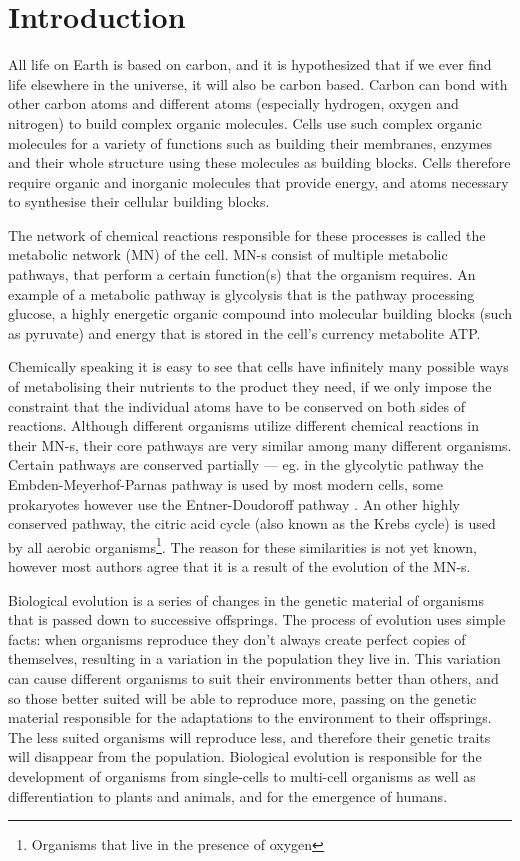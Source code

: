\documentclass[a4paper,12pt]{article}
\begin{document}
	\newpage
	\section{Introduction}

	All life on Earth is based on carbon, and it is hypothesized that if we ever find life elsewhere in the universe, it will also be carbon based. %
	Carbon can bond with other carbon atoms and different atoms (especially hydrogen, oxygen and nitrogen) to build complex organic molecules. Cells use such complex organic molecules for a variety of functions such as building their membranes, enzymes and their whole structure using these molecules as building blocks. Cells therefore require organic and inorganic molecules that provide energy, and atoms necessary to synthesise their cellular building blocks.

	The network of chemical reactions responsible for these processes is called the metabolic network (MN) of the cell. MN-s consist of multiple metabolic pathways, that perform a certain function(s) that the organism requires. An example of a metabolic pathway is glycolysis that is the pathway processing glucose, a highly energetic organic compound into molecular building blocks (such as pyruvate) and energy that is stored in the cell's currency metabolite ATP.
	
	Chemically speaking it is easy to see that cells have  infinitely many possible ways of metabolising their nutrients to the product they need, if we only impose the constraint that the individual atoms have to be conserved on both sides of reactions. Although different organisms utilize different chemical reactions in their MN-s, their core pathways are very similar among many different organisms. Certain pathways are conserved partially ---  eg. in the glycolytic pathway the Embden-Meyerhof-Parnas  pathway \cite{EMPpathway} is used by most modern cells,  some prokaryotes however  use the Entner-Doudoroff pathway \cite{EDpathway}. An other highly conserved pathway, the citric acid cycle (also known as the Krebs cycle) is used by all aerobic organisms\footnote{Organisms that live in the presence of oxygen}.
	The reason for these similarities is not yet known, however most authors agree that it is a result of the evolution of the MN-s. 

	Biological evolution is a series of changes in the genetic material of organisms that is passed down to successive offsprings. The process of evolution uses simple facts: when organisms reproduce they don't always create perfect copies of themselves, resulting in a variation in the population they live in. This variation can cause different organisms to suit their environments better than others, and so those better suited will be able to reproduce more, passing on the genetic material responsible for the adaptations to the environment to their offsprings. The less suited organisms will reproduce less, and therefore their genetic traits will disappear from the population. 
	 Biological evolution is responsible for the development of organisms from single-cells to multi-cell organisms as well as differentiation to plants and animals, and for the emergence of humans. 
\end{document}
